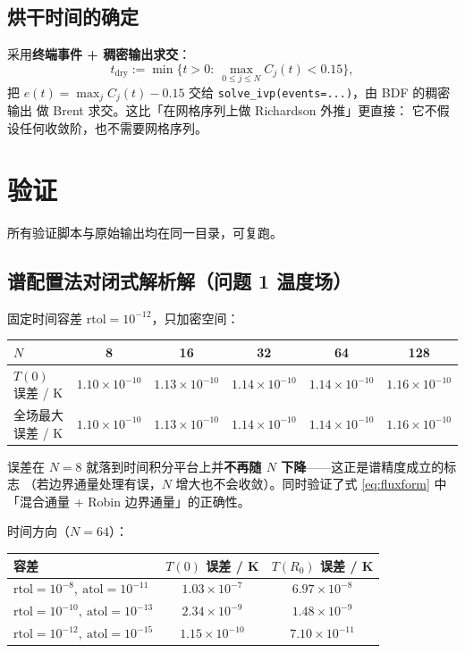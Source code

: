 \documentclass[11pt,a4paper]{article}
\theoremstyle{definition}
\begin{document}
\subsection{烘干时间的确定}

采用\textbf{终端事件 + 稠密输出求交}：
\begin{equation}
t_{\text{dry}}:=\min\Big\{t>0:\ \max_{0\le j\le N}C_j(t)<0.15\Big\},
\label{eq:tdry}
\end{equation}
把 $e(t)=\max_jC_j(t)-0.15$ 交给 \texttt{solve\_ivp(events=...)}，由 BDF 的稠密输出
做 Brent 求交。这比「在网格序列上做 Richardson 外推」更直接：
它不假设任何收敛阶，也不需要网格序列。

\section{验证}
\label{sec:conv}

所有验证脚本与原始输出均在同一目录，可复跑。

\subsection{谱配置法对闭式解析解（问题 1 温度场）}
\label{sec:conv}

固定时间容差 $\mathrm{rtol}=10^{-12}$，只加密空间：

\begin{center}
\small
\begin{tabular}{@{}lccccc@{}}
\toprule
$N$ & 8 & 16 & 32 & 64 & 128 \\
\midrule
$T(0)$ 误差 / K & $1.10\times10^{-10}$ & $1.13\times10^{-10}$ & $1.14\times10^{-10}$ & $1.14\times10^{-10}$ & $1.16\times10^{-10}$ \\
全场最大误差 / K & $1.10\times10^{-10}$ & $1.13\times10^{-10}$ & $1.14\times10^{-10}$ & $1.14\times10^{-10}$ & $1.16\times10^{-10}$ \\
\bottomrule
\end{tabular}
\end{center}

误差在 $N=8$ 就落到时间积分平台上并\textbf{不再随 $N$ 下降}——这正是谱精度成立的标志
（若边界通量处理有误，$N$ 增大也不会收敛）。同时验证了式 \eqref{eq:fluxform} 中
「混合通量 + Robin 边界通量」的正确性。

时间方向（$N=64$）：

\begin{center}
\small
\begin{tabular}{@{}lcc@{}}
\toprule
容差 & $T(0)$ 误差 / K & $T(R_0)$ 误差 / K \\
\midrule
$\mathrm{rtol}=10^{-8},\ \mathrm{atol}=10^{-11}$ & $1.03\times10^{-7}$ & $6.97\times10^{-8}$ \\
$\mathrm{rtol}=10^{-10},\ \mathrm{atol}=10^{-13}$ & $2.34\times10^{-9}$ & $1.48\times10^{-9}$ \\
$\mathrm{rtol}=10^{-12},\ \mathrm{atol}=10^{-15}$ & $1.15\times10^{-10}$ & $7.10\times10^{-11}$ \\
\bottomrule
\end{tabular}
\end{center}
\end{document}
